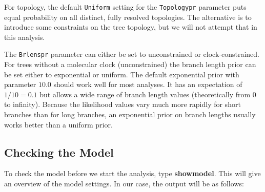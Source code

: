 \documentclass[12pt]{book}
\begin{document}
For topology, the default \texttt{Uniform} setting for the \texttt{Topologypr} parameter puts equal
 probability on all distinct, fully resolved topologies. The alternative is to introduce some constraints
 on the tree topology, but we will not attempt that in this analysis.

The \texttt{Brlenspr} parameter can either be set to unconstrained or clock-constrained. For trees without
 a molecular clock (unconstrained) the branch length prior can be set either to exponential or uniform. The
 default exponential prior with parameter $10.0$ should work well for most analyses. It has an expectation
 of $1/10 = 0.1$ but allows a wide range of branch length values (theoretically from 0 to infinity).
 Because the likelihood values vary much more rapidly for short branches than for long branches, an
 exponential prior on branch lengths usually works better than a uniform prior.

\subsection{Checking the Model}

To check the model before we start the analysis, type \textbf{showmodel}. This will give an overview of the
 model settings. In our case, the output will be as follows:
\end{document}

